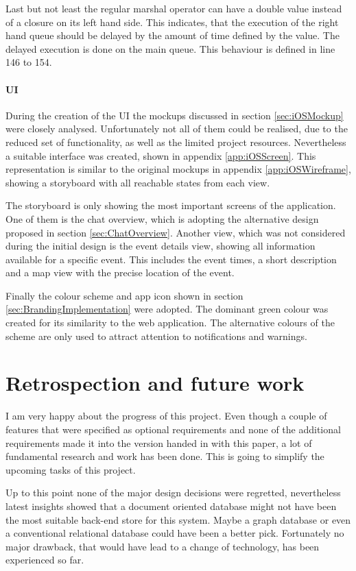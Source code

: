 Last but not least the regular marshal operator can have a double value instead of a closure on its left hand side. This indicates, that the execution of the right hand queue should be delayed by the amount of time defined by the value. The delayed execution is done on the main queue. This behaviour is defined in line 146 to 154.

\subsubsection{UI}

During the creation of the \gls{UI} the mockups discussed in section \vref{sec:iOSMockup} were closely analysed. Unfortunately not all of them could be realised, due to the reduced set of functionality, as well as the limited project resources. Nevertheless a suitable interface was created, shown in appendix \vref{app:iOSScreen}. This representation is similar to the original mockups in appendix \vref{app:iOSWireframe}, showing a storyboard with all reachable states from each view. 

The storyboard is only showing the most important screens of the application. One of them is the chat overview, which is adopting the alternative design proposed in section \vref{sec:ChatOverview}. Another view, which was not considered during the initial design is the event details view, showing all information available for a specific event. This includes the event times, a short description and a map view with the precise location of the event.

Finally the colour scheme and app icon shown in section \vref{sec:BrandingImplementation} were adopted. The dominant green colour was created for its similarity to the web application. The alternative colours of the scheme are only used to attract attention to notifications and warnings. 

\chapter{Retrospection and future work}
\label{chapter:OngoingWork}

I am very happy about the progress of this project. Even though a couple of features that were specified as optional requirements and none of the additional requirements made it into the version handed in with this paper, a lot of fundamental research and work has been done. This is going to simplify the upcoming tasks of this project. 

Up to this point none of the major design decisions were regretted, nevertheless latest insights showed that a document oriented database might not have been the most suitable back-end store for this system. Maybe a graph database or even a conventional relational database could have been a better pick. Fortunately no major drawback, that would have lead to a change of technology, has been experienced so far.

